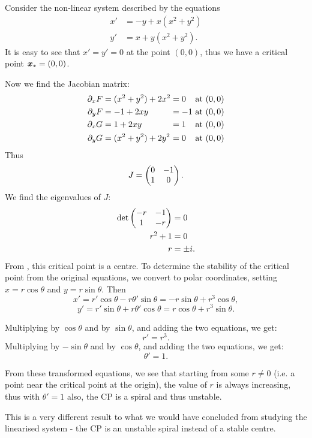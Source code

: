 \begin{eg}\label{eg:centrecp}
	Consider the non-linear system described by the equations
	\begin{align*}
		x' &= -y + x(x^2+y^2) \\
		y' &= x + y(x^2+y^2).
	\end{align*}
	It is easy to see that $x'=y'=0$ at the point $(0,0)$, thus we have a critical point $\bm{x}_{\ast} = (0,0)$.
	
	Now we find the Jacobian matrix:
	\begin{equation*}
		\begin{alignedat}{3}
			\partial_x F &= (x^2+y^2) + 2x^2 &&= 0 &\text{ at } (0,0) \\
			\partial_y F &= -1 + 2xy &&= -1 &\text{ at } (0,0) \\
			\partial_x G &= 1 + 2xy &&= 1 &\text{ at } (0,0) \\
			\partial_y G &= (x^2+y^2) + 2y^2 &&= 0 &\text{ at } (0,0) \\
		\end{alignedat}
	\end{equation*}
	Thus
	\[
	J = \begin{pmatrix}0 & -1 \\ 1 & 0\end{pmatrix}.
	\]
	We find the eigenvalues of $J$:
	\begin{align*}
		\det \begin{pmatrix}-r & -1 \\ 1 & -r\end{pmatrix} &= 0 \\
		r^2 + 1 &= 0 \\
		r &= \pm i.
	\end{align*}
	From , this critical point is a centre. To determine the stability of the critical point from the original equations, we convert to polar coordinates, setting $x=r\cos\theta$ and $y=r\sin\theta$. Then
	\begin{equation}\label{eq:polareg1}
		x' = r'\cos{\theta} - r\theta'\sin{\theta} = -r\sin\theta + r^3\cos\theta,
	\end{equation}
	\begin{equation}\label{eq:polareg2}
		y' = r'\sin{\theta} + r\theta'\cos{\theta} = r\cos\theta + r^3\sin\theta.
	\end{equation}
	
	Multiplying  by $\cos{\theta}$ and  by $\sin{\theta}$, and adding the two equations, we get: 
	\[
	r' = r^3.
	\]
	Multiplying  by $-\sin{\theta}$ and  by $\cos{\theta}$, and adding the two equations, we get: 
	\[
	\theta' = 1.
	\]
	
	From these transformed equations, we see that starting from some $r\neq 0$ (i.e. a point near the critical point at the origin), the value of $r$ is always increasing, thus with $\theta'=1$ also, the CP is a spiral and thus unstable.
	
	This is a very different result to what we would have concluded from studying the linearised system - the CP is an unstable spiral instead of a stable centre.
\end{eg}

